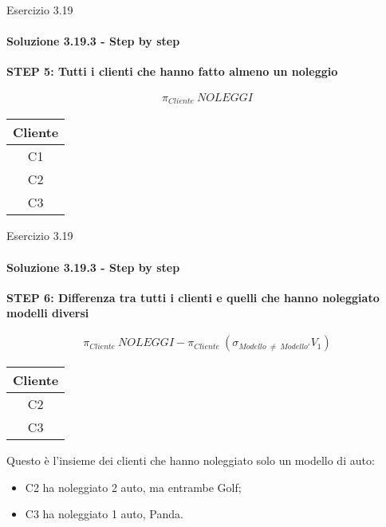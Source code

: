 %
\begin{frame}{Esercizio 3.19}
    \framesubtitle{Soluzione 3.19.3 - Step by step}
    \vspace*{-1cm}

    {\small \textbf{STEP 5: Tutti i clienti che hanno fatto almeno un noleggio}}

    \small
    \begin{gather*}
        \pi_{Cliente}~NOLEGGI
    \end{gather*}

    \centering
    \begin{tabular}{|c|}
    \hline
    \rowcolor{cyan!30} Cliente \\
    \hline
    C1 \\
    \hline
    C2 \\
    \hline
    C3 \\
    \hline
    \end{tabular}
\end{frame}
%
\begin{frame}{Esercizio 3.19}
    \framesubtitle{Soluzione 3.19.3 - Step by step}
    \vspace*{-1cm}

    {\small \textbf{STEP 6: Differenza tra tutti i clienti e quelli che hanno noleggiato modelli diversi}}

    \small
    \begin{gather*}
        \pi_{Cliente}~NOLEGGI - \pi_{Cliente}~(\sigma_{Modello~\neq~Modello'} V_1)
    \end{gather*}

    \centering
    
    \begin{tabular}{|c|}
    \hline
    \rowcolor{cyan!30} Cliente \\
    \hline
    C2 \\
    \hline
    C3 \\
    \hline
    \end{tabular}

    \vspace{.3cm}

    Questo \`e l'insieme dei clienti che hanno noleggiato solo un modello di auto:
    \begin{itemize}
        \item C2 ha noleggiato 2 auto, ma entrambe Golf;
        \item C3 ha noleggiato 1 auto, Panda.
    \end{itemize}

\end{frame}